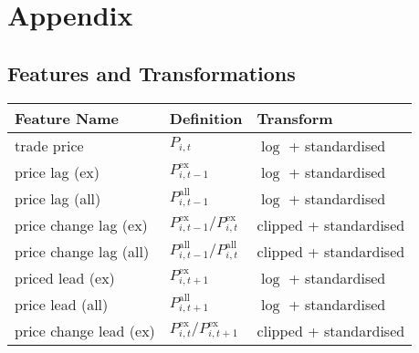 \section{Appendix}


\subsection{Features and Transformations}
\label{app:feature-sets}

\begin{table}[H]
    \centering
    \begin{threeparttable}
        \begin{tabular}{@{}lll@{}}
            \toprule
            Feature Name            & Definition                                                                                       & Transform \\ \midrule
            trade price             & $P_{i, t}$                                                                                       & $\log$ + standardised \\
            price lag (ex)          & $P_{i, t-1}^{\text{ex}}$\tnote{*}                                                                & $\log$ + standardised          \\
            price lag (all)         & $P_{i, t-1}^{\text{all}}$\tnote{*}                                                               & $\log$ + standardised          \\
            price change lag (ex)   & $P_{i, t-1}^{\text{ex}}/P_{i, t}^{\text{ex}}$\tnote{*}                                           & clipped + standardised          \\
            price change lag (all)  & $P_{i, t-1}^{\text{all}}/P_{i, t}^{\text{all}}$\tnote{*}                                         & clipped + standardised          \\
            priced lead (ex)        & $P_{i, t+1}^{\text{ex}}$\tnote{*}                                                                & $\log$ + standardised          \\
            price lead (all)        & $P_{i, t+1}^{\text{all}}$\tnote{*}                                                               & $\log$ + standardised          \\
            price change lead (ex)  & $P_{i, t}^{\text{ex}}/P_{i, t+1}^{\text{ex}}$\tnote{*}                                           & clipped + standardised          \\

\end{tabular}
\end{threeparttable}
\end{table}
